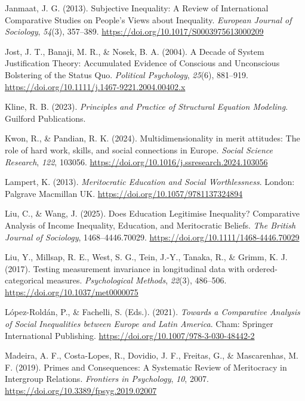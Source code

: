 \documentclass[
  13pt,
]{article}
\newlength{\cslhangindent}
\newenvironment{CSLReferences}[2] %
 {\begin{list}{}{%
  \setlength{\itemindent}{0pt}
  \setlength{\leftmargin}{0pt}
  \setlength{\parsep}{0pt}
  \ifodd #1
   \setlength{\leftmargin}{\cslhangindent}
   \setlength{\itemindent}{-1\cslhangindent}
  \fi
  \setlength{\itemsep}{#2\baselineskip}}}
 {\end{list}}
\begin{document}
\begin{CSLReferences}{1}{0}
Janmaat, J. G. (2013). Subjective {Inequality}: A {Review} of
{International Comparative Studies} on {People}'s {Views} about
{Inequality}. \emph{European Journal of Sociology}, \emph{54}(3),
357--389. \url{https://doi.org/10.1017/S0003975613000209}

Jost, J. T., Banaji, M. R., \& Nosek, B. A. (2004). A {Decade} of
{System Justification Theory}: {Accumulated Evidence} of {Conscious} and
{Unconscious Bolstering} of the {Status Quo}. \emph{Political
Psychology}, \emph{25}(6), 881--919.
\url{https://doi.org/10.1111/j.1467-9221.2004.00402.x}

Kline, R. B. (2023). \emph{Principles and {Practice} of {Structural
Equation Modeling}}. Guilford Publications.

Kwon, R., \& Pandian, R. K. (2024). Multidimensionality in merit
attitudes: {The} role of hard work, skills, and social connections in
{Europe}. \emph{Social Science Research}, \emph{122}, 103056.
\url{https://doi.org/10.1016/j.ssresearch.2024.103056}

Lampert, K. (2013). \emph{Meritocratic {Education} and {Social
Worthlessness}}. London: Palgrave Macmillan UK.
\url{https://doi.org/10.1057/9781137324894}

Liu, C., \& Wang, J. (2025). Does {Education Legitimise Inequality}?
{Comparative Analysis} of {Income Inequality}, {Education}, and
{Meritocratic Beliefs}. \emph{The British Journal of Sociology},
1468--4446.70029. \url{https://doi.org/10.1111/1468-4446.70029}

Liu, Y., Millsap, R. E., West, S. G., Tein, J.-Y., Tanaka, R., \& Grimm,
K. J. (2017). Testing measurement invariance in longitudinal data with
ordered-categorical measures. \emph{Psychological Methods},
\emph{22}(3), 486--506. \url{https://doi.org/10.1037/met0000075}

López-Roldán, P., \& Fachelli, S. (Eds.). (2021). \emph{Towards a
{Comparative Analysis} of {Social Inequalities} between {Europe} and
{Latin America}}. Cham: Springer International Publishing.
\url{https://doi.org/10.1007/978-3-030-48442-2}

Madeira, A. F., Costa-Lopes, R., Dovidio, J. F., Freitas, G., \&
Mascarenhas, M. F. (2019). Primes and {Consequences}: {A Systematic
Review} of {Meritocracy} in {Intergroup Relations}. \emph{Frontiers in
Psychology}, \emph{10}, 2007.
\url{https://doi.org/10.3389/fpsyg.2019.02007}


\end{CSLReferences}
\end{document}
